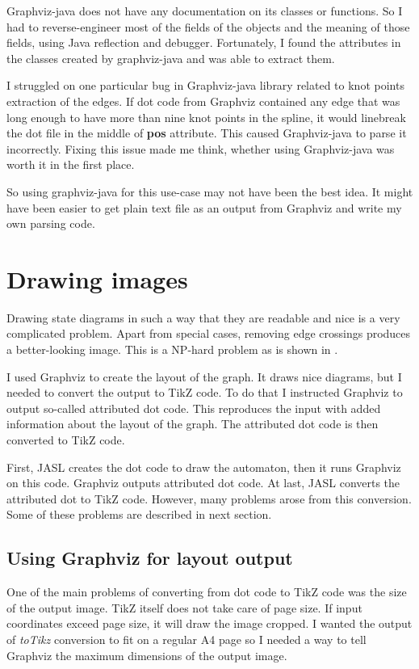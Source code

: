 \documentclass{ctuthesis}
\begin{document}
Graphviz-java does not have any documentation on its classes or functions. So I had to reverse-engineer most of the fields of the objects and the meaning of those fields, using Java reflection and debugger. Fortunately, I found the attributes in the classes created by graphviz-java and was able to extract them. 

I struggled on one particular bug in Graphviz-java library related to knot points extraction of the edges. If dot code from Graphviz contained any edge that was long enough to have more than nine knot points in the spline, it would linebreak the dot file in the middle of \textbf{pos} attribute. This caused Graphviz-java to parse it incorrectly. Fixing this issue made me think, whether using Graphviz-java was worth it in the first place.

So using graphviz-java for this use-case may not have been the best idea. It might have been easier to get plain text file as an output from Graphviz and write my own parsing code. 

\chapter{Drawing images}
\label{drawing-images}
Drawing state diagrams in such a way that they are readable and nice is a very complicated problem. Apart from special cases, removing edge crossings produces a better-looking image. This is a NP-hard problem as is shown in \cite{crossing-problem}.

I used Graphviz to create the layout of the graph. It draws nice diagrams, but I needed to convert the output to TikZ code. To do that I instructed Graphviz to output so-called attributed dot code. This reproduces the input with added information about the layout of the graph. The attributed dot code is then converted to TikZ code. 


First, JASL creates the dot code to draw the automaton, then it runs Graphviz on this code. Graphviz outputs attributed dot code. At last, JASL converts the attributed dot to TikZ code. However, many problems arose from this conversion. Some of these problems are described in next section.

\section{Using Graphviz for layout output}
\label{sec:problems_graphviz}
One of the main problems of converting from dot code to TikZ code was the size of the output image. TikZ itself does not take care of page size. If input coordinates exceed page size, it will draw the image cropped. I wanted the output of \textit{toTikz} conversion to fit on a regular A4 page so I needed a way to tell Graphviz the maximum dimensions of the output image. 
\end{document}
